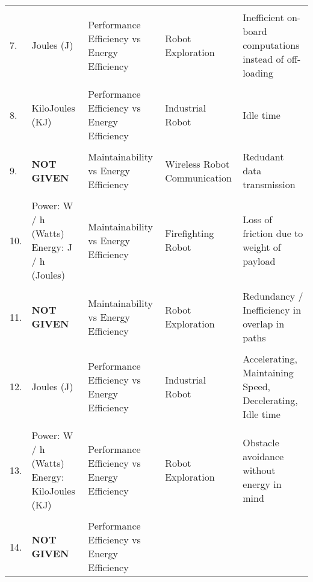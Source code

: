 \begin{table}[h]
\begin{tabular}{p{0.1cm}p{3cm}p{4cm}p{4cm}p{4cm}}
            \hline
            \\
            {7.} &
                {Joules (J)} &
                {Performance Efficiency vs Energy Efficiency} &
                {Robot Exploration} &
                {Inefficient on-board computations instead of off-loading} \\
            \hline
            \\
            {8.} &
                {KiloJoules (KJ)} &
                {Performance Efficiency vs Energy Efficiency} &
                {Industrial Robot} &
                {Idle time} \\
            \hline
            \\
            {9.} &
                {\textbf{NOT GIVEN}} &
                {Maintainability vs Energy Efficiency} &
                {Wireless Robot Communication} &
                {Redudant data transmission} \\
            \hline
            \\
            {10.} &
                {Power: W / h (Watts)
                Energy: J / h (Joules)} &
                {Maintainability vs Energy Efficiency} &
                {Firefighting Robot} &
                {Loss of friction due to weight of payload} \\
            \hline
            \\
            {11.} &
                {\textbf{NOT GIVEN}} &
                {Maintainability vs Energy Efficiency} &
                {Robot Exploration} &
                {Redundancy / Inefficiency in overlap in paths} \\
            \hline
            \\
            {12.} &
                {Joules (J)} &
                {Performance Efficiency vs Energy Efficiency} &
                {Industrial Robot} &
                {Accelerating, Maintaining Speed, Decelerating, Idle time} \\
            \hline
            \\
            {13.} &
                {Power: W / h (Watts)
                Energy: KiloJoules (KJ)} &
                {Performance Efficiency vs Energy Efficiency} &
                {Robot Exploration} &
                {Obstacle avoidance without energy in mind} \\
            \hline
            \\
            {14.} &
                {\textbf{NOT GIVEN}} &
                {Performance Efficiency vs Energy Efficiency} &

\end{tabular}
\end{table}
